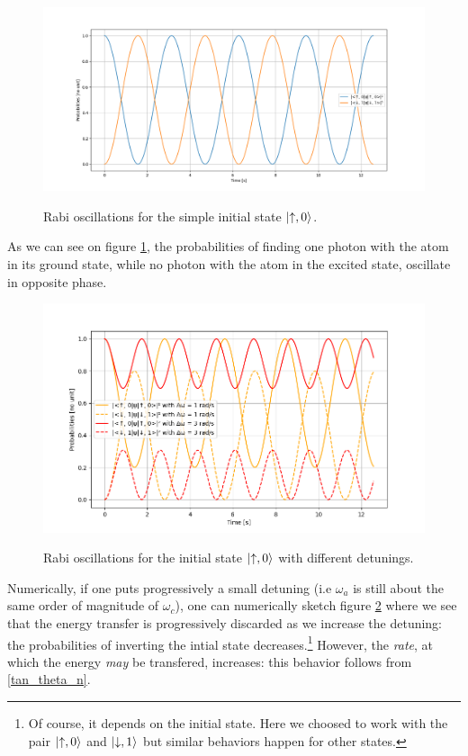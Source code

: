 \documentclass[12pt]{report}
\DeclarePairedDelimiter\ket{\lvert}{\rangle}
\begin{document}
\begin{figure}[h]
\caption{Rabi oscillations for the simple initial state $\ket{\uparrow, 0}$.}
\centering
\includegraphics[width=\textwidth]{rabi-no-delta}
\label{fig:rabi-no-delta}
\end{figure}

As we can see on figure \ref{fig:rabi-no-delta}, the probabilities of finding one photon with the atom in its ground state, while no photon with the atom in the excited state, oscillate in opposite phase.

\begin{figure}[h!]
\caption{Rabi oscillations for the initial state $\ket{\uparrow, 0}$ with different detunings.}
\centering
\includegraphics[width=\textwidth]{rabi-prog-delta}
\label{fig:rabi-prog-delta}
\end{figure}

Numerically, if one puts progressively a small detuning (i.e $\omega_a$ is still about the same order of magnitude of $\omega_c$), one can numerically sketch figure \ref{fig:rabi-prog-delta} where we see that the energy transfer is progressively discarded as we increase the detuning: the probabilities of inverting the intial state decreases.\footnote{Of course, it depends on the initial state. Here we choosed to work with the pair $\ket{\uparrow, 0}$ and $\ket{\downarrow, 1}$ but similar behaviors happen for other states.} However, the \textit{rate}, at which the energy \textit{may} be transfered, increases: this behavior follows from \eqref{tan_theta_n}.
\end{document}
